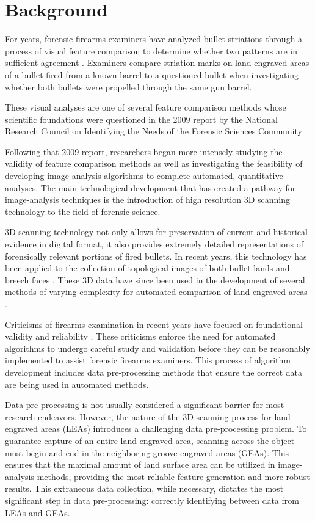 \documentclass[12pt]{article}
\begin{document}
\section{Background}

For years, forensic firearms examiners have analyzed bullet striations
through a process of visual feature comparison to determine whether two
patterns are in sufficient agreement \citep{AFTE}. Examiners compare
striation marks on land engraved areas of a bullet fired from a known
barrel to a questioned bullet when investigating whether both bullets
were propelled through the same gun barrel.

These visual analyses are one of several feature comparison methods
whose scientific foundations were questioned in the 2009 report by the
National Research Council on Identifying the Needs of the Forensic
Sciences Community \citep{NRC2009}.

Following that 2009 report, researchers began more intensely studying
the validity of feature comparison methods as well as investigating the
feasibility of developing image-analysis algorithms to complete
automated, quantitative analyses. The main technological development
that has created a pathway for image-analysis techniques is the
introduction of high resolution 3D scanning technology to the field of
forensic science.

3D scanning technology not only allows for preservation of current and
historical evidence in digital format, it also provides extremely
detailed representations of forensically relevant portions of fired
bullets. In recent years, this technology has been applied to the
collection of topological images of both bullet lands and breech faces
\citep[e.g.][]{DeKinder1, DeKinder2, Bachrach1}. These 3D data have
since been used in the development of several methods of varying
complexity for automated comparison of land engraved areas
\citep[e.g.][]{Ma1, Chu1, Chu2, Hare1}.

Criticisms of firearms examination in recent years have focused on
foundational validity and reliability \citep[e.g.][]{PCAST2016}. These
criticisms enforce the need for automated algorithms to undergo careful
study and validation before they can be reasonably implemented to assist
forensic firearms examiners. This process of algorithm development
includes data pre-processing methods that ensure the correct data are
being used in automated methods.

Data pre-processing is not usually considered a significant barrier for
most research endeavors. However, the nature of the 3D scanning process
for land engraved areas (LEAs) introduces a challenging data
pre-processing problem. To guarantee capture of an entire land engraved
area, scanning across the object must begin and end in the neighboring
groove engraved areas (GEAs). This ensures that the maximal amount of
land surface area can be utilized in image-analysis methods, providing
the most reliable feature generation and more robust results. This
extraneous data collection, while necessary, dictates the most
significant step in data pre-processing: correctly identifying between
data from LEAs and GEAs.
\end{document}
